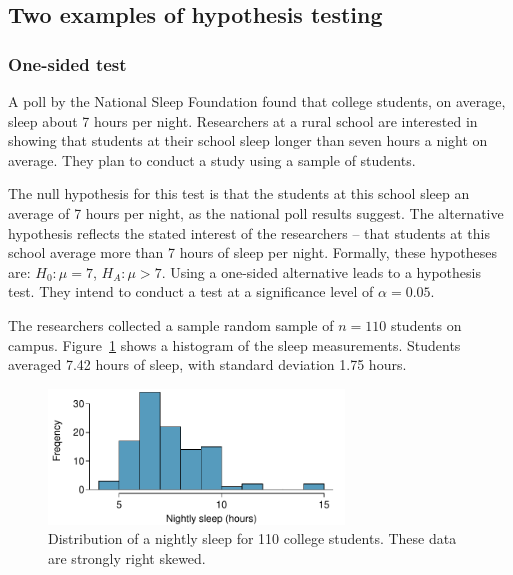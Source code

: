 \begin{spacing}{1.5}
\subsection{Two examples of hypothesis testing}
\label{hypothesisTestingExamples}


\subsubsection{One-sided test}

A poll by the National Sleep Foundation found that college students, on average, sleep about 7 hours per night. Researchers at a rural school are interested in showing that students at their school sleep longer than seven hours a night on average. They plan to conduct a study using a sample of students.

The null hypothesis for this test is that the students at this school sleep an average of 7 hours per night, as the national poll results suggest. The alternative hypothesis reflects the stated interest of the researchers -- that students at this school average more than 7 hours of sleep per night. Formally, these hypotheses are: $H_0: \mu = 7$, $H_A: \mu > 7$. Using a one-sided alternative leads to a  hypothesis test. They intend to conduct a test at a significance level of $\alpha = 0.05$.

The researchers collected a sample random sample of $n = 110$ students on campus. Figure~\ref{histOfSleepForCollegeThatWasCheckingForMoreThan7Hours} shows a histogram of the sleep measurements. Students averaged 7.42 hours of sleep, with standard deviation 1.75 hours. 

\begin{figure}[h]
	\centering
	\includegraphics[width=0.7\textwidth]{ch_inference_foundations_oi_biostat/figures/histOfSleepForCollegeThatWasCheckingForMoreThan7Hours/histOfSleepForCollegeThatWasCheckingForMoreThan7Hours}
	\caption{Distribution of a nightly sleep for 110 college students. These data are strongly right skewed.}
	\label{histOfSleepForCollegeThatWasCheckingForMoreThan7Hours}
\end{figure}


\end{spacing}
